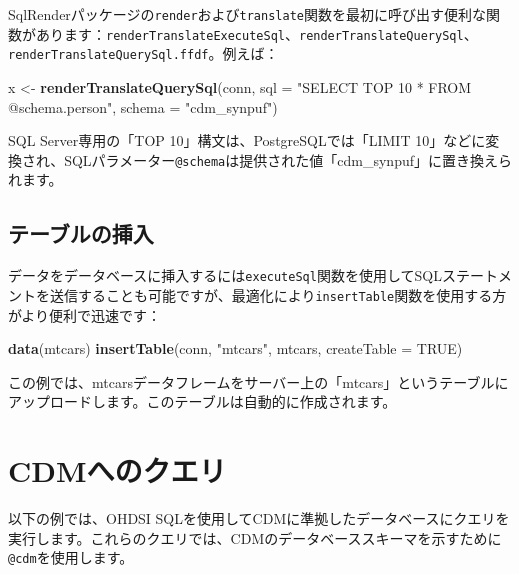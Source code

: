 \documentclass[
  11pt]{book}
\newenvironment{Shaded}{\begin{snugshade}}{\end{snugshade}}
\newcommand{\AttributeTok}[1]{\textcolor[rgb]{0.13,0.29,0.53}{#1}}
\newcommand{\ConstantTok}[1]{\textcolor[rgb]{0.56,0.35,0.01}{#1}}
\newcommand{\FunctionTok}[1]{\textcolor[rgb]{0.13,0.29,0.53}{\textbf{#1}}}
\newcommand{\NormalTok}[1]{#1}
\newcommand{\OtherTok}[1]{\textcolor[rgb]{0.56,0.35,0.01}{#1}}
\newcommand{\StringTok}[1]{\textcolor[rgb]{0.31,0.60,0.02}{#1}}
\theoremstyle{definition}
\theoremstyle{definition}
\theoremstyle{definition}
\theoremstyle{definition}
\theoremstyle{remark}
\begin{document}
SqlRenderパッケージの\texttt{render}および\texttt{translate}関数を最初に呼び出す便利な関数があります：\texttt{renderTranslateExecuteSql}、\texttt{renderTranslateQuerySql}、\texttt{renderTranslateQuerySql.ffdf}。例えば：

\begin{Shaded}
\begin{Highlighting}[]
\NormalTok{x }\OtherTok{\textless{}{-}} \FunctionTok{renderTranslateQuerySql}\NormalTok{(conn,}
                             \AttributeTok{sql =} \StringTok{"SELECT TOP 10 * FROM @schema.person"}\NormalTok{,}
                             \AttributeTok{schema =} \StringTok{"cdm\_synpuf"}\NormalTok{)}
\end{Highlighting}
\end{Shaded}

SQL Server専用の「TOP 10」構文は、PostgreSQLでは「LIMIT 10」などに変換され、SQLパラメーター\texttt{@schema}は提供された値「cdm\_synpuf」に置き換えられます。

\subsection{テーブルの挿入}\label{ux30c6ux30fcux30d6ux30ebux306eux633fux5165}

データをデータベースに挿入するには\texttt{executeSql}関数を使用してSQLステートメントを送信することも可能ですが、最適化により\texttt{insertTable}関数を使用する方がより便利で迅速です：

\begin{Shaded}
\begin{Highlighting}[]
\FunctionTok{data}\NormalTok{(mtcars)}
\FunctionTok{insertTable}\NormalTok{(conn, }\StringTok{"mtcars"}\NormalTok{, mtcars, }\AttributeTok{createTable =} \ConstantTok{TRUE}\NormalTok{)}
\end{Highlighting}
\end{Shaded}

この例では、mtcarsデータフレームをサーバー上の「mtcars」というテーブルにアップロードします。このテーブルは自動的に作成されます。

\section{CDMへのクエリ}\label{QueryTheCdm}

以下の例では、OHDSI SQLを使用してCDMに準拠したデータベースにクエリを実行します。これらのクエリでは、CDMのデータベーススキーマを示すために\texttt{@cdm}を使用します。
\end{document}
